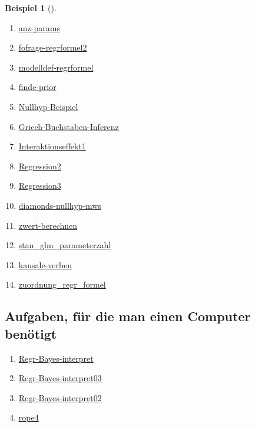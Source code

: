\documentclass[
  ngerman,
  letterpaper,
  twoside,
  open=any]{scrbook}
\providecommand{\tightlist}{%
  \setlength{\itemsep}{0pt}\setlength{\parskip}{0pt}}\usepackage{longtable,booktabs,array}
\theoremstyle{definition}
\newtheorem{example}{Beispiel}[chapter]
\theoremstyle{plain}
\theoremstyle{definition}
\theoremstyle{definition}
\theoremstyle{remark}
\begin{document}
\begin{example}[]
\begin{enumerate}
\def\labelenumi{\arabic{enumi}.}
\tightlist
\item
  \href{https://datenwerk.netlify.app/posts/anz-params/}{anz-params}
\item
  \href{https://datenwerk.netlify.app/posts/fofrage-regrformel2/}{fofrage-regrformel2}
\item
  \href{https://datenwerk.netlify.app/posts/modelldef-regrformel/}{modelldef-regrformel}
\item
  \href{https://datenwerk.netlify.app/posts/finde-prior/}{finde-prior}
\item
  \href{https://datenwerk.netlify.app/posts/nullhyp-beispiel/nullhyp-beispiel}{Nullhyp-Beispiel}
\item
  \href{https://datenwerk.netlify.app/posts/griech-buchstaben-inferenz/griech-buchstaben-inferenz}{Griech-Buchstaben-Inferenz}
\item
  \href{https://datenwerk.netlify.app/posts/interaktionseffekt1/interaktionseffekt1}{Interaktionseffekt1}
\item
  \href{https://datenwerk.netlify.app/posts/regression2/regression2}{Regression2}
\item
  \href{https://datenwerk.netlify.app/posts/regression3/regression3}{Regression3}
\item
  \href{https://datenwerk.netlify.app/posts/diamonds-nullhyp-mws/diamonds-nullhyp-mws.html}{diamonds-nullhyp-mws}
\item
  \href{https://datenwerk.netlify.app/posts/zwert-berechnen/zwert-berechnen.html}{zwert-berechnen}
\item
  \href{https://datenwerk.netlify.app/posts/stan_glm_parameterzahl/stan_glm_parameterzahl.html}{stan\_glm\_parameterzahl}
\item
  \href{https://datenwerk.netlify.app/posts/kausale-verben/kausale-verben}{kausale-verben}
\item
  \href{https://sebastiansauer.github.io/datenwerk/posts/zuordnung_regr_formel1/}{zuordnung\_regr\_formel}
\end{enumerate}

\subsection{Aufgaben, für die man einen Computer
benötigt}\label{aufgaben-fuxfcr-die-man-einen-computer-benuxf6tigt-1}

\begin{enumerate}
\def\labelenumi{\arabic{enumi}.}
\tightlist
\item
  \href{https://datenwerk.netlify.app/posts/regr-bayes-interpret/regr-bayes-interpret}{Regr-Bayes-interpret}
\item
  \href{https://datenwerk.netlify.app/posts/regr-bayes-interpret03/regr-bayes-interpret03.html}{Regr-Bayes-interpret03}
\item
  \href{https://datenwerk.netlify.app/posts/regr-bayes-interpret02/regr-bayes-interpret02.html}{Regr-Bayes-interpret02}
\item
  \href{https://datenwerk.netlify.app/posts/rope4/rope4.html}{rope4}
\end{enumerate}


\end{example}
\end{document}
